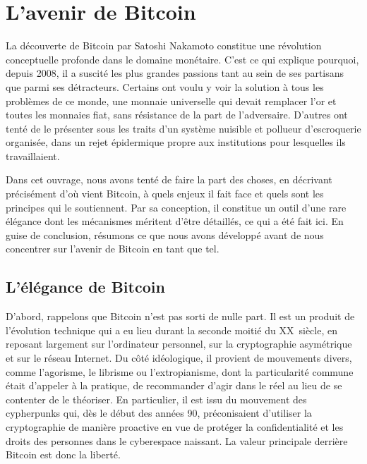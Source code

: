 
\chapter{L'avenir de Bitcoin} %
\label{ch:avenir}


La découverte de Bitcoin par Satoshi Nakamoto constitue une révolution conceptuelle profonde dans le domaine monétaire. C'est ce qui explique pourquoi, depuis 2008, il a suscité les plus grandes passions tant au sein de ses partisans que parmi ses détracteurs. Certains ont voulu y voir la solution à tous les problèmes de ce monde, une monnaie universelle qui devait remplacer l'or et toutes les monnaies fiat, sans résistance de la part de l'adversaire. D'autres ont tenté de le présenter sous les traits d'un système nuisible et pollueur d'escroquerie organisée, dans un rejet épidermique propre aux institutions pour lesquelles ils travaillaient.

Dans cet ouvrage, nous avons tenté de faire la part des choses, en décrivant précisément d'où vient Bitcoin, à quels enjeux il fait face et quels sont les principes qui le soutiennent. Par sa conception, il constitue un outil d'une rare élégance dont les mécanismes méritent d'être détaillés, ce qui a été fait ici. En guise de conclusion, résumons ce que nous avons développé avant de nous concentrer sur l'avenir de Bitcoin en tant que tel. %

\section*{L'élégance de Bitcoin}


D'abord, rappelons que Bitcoin n'est pas sorti de nulle part. Il est un produit de l'évolution technique qui a eu lieu durant la seconde moitié du \textsc{XX}\ieme{}~siècle, en reposant largement sur l'ordinateur personnel, sur la cryptographie asymétrique et sur le réseau Internet. Du côté idéologique, il provient de mouvements divers, comme l'agorisme, le librisme ou l'extropianisme, dont la particularité commune était d'appeler à la pratique, de recommander d'agir dans le réel au lieu de se contenter de le théoriser. En particulier, il est issu du mouvement des cypherpunks qui, dès le début des années 90, préconisaient d'utiliser la cryptographie de manière proactive en vue de protéger la confidentialité et les droits des personnes dans le cyberespace naissant. La valeur principale derrière Bitcoin est donc la liberté.

